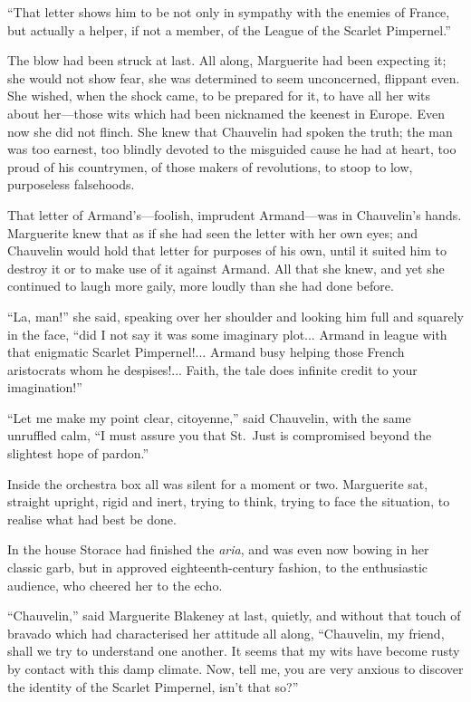 \documentclass[paper=5.5in:8.5in,BCOR=7mm,twoside,DIV=calc,12pt,usegeometry,chapterprefix,endperiod,headings=big]{scrbook}
\begin{document}
\enquote{That letter shows him to be not only in sympathy with the enemies of France, but actually a helper, if not a member, of the League of the Scarlet Pimpernel.}

The blow had been struck at last. All along, Marguerite had been expecting it; she would not show fear, she was determined to seem unconcerned, flippant even. She wished, when the shock came, to be prepared for it, to have all her wits about her---those wits which had been nicknamed the keenest in Europe. Even now she did not flinch. She knew that Chauvelin had spoken the truth; the man was too earnest, too blindly devoted to the misguided cause he had at heart, too proud of his countrymen, of those makers of revolutions, to stoop to low, purposeless falsehoods.

That letter of Armand's---foolish, imprudent Armand---was in Chauvelin's hands. Marguerite knew that as if she had seen the letter with her own eyes; and Chauvelin would hold that letter for purposes of his own, until it suited him to destroy it or to make use of it against Armand. All that she knew, and yet she continued to laugh more gaily, more loudly than she had done before.

\enquote{La, man!} she said, speaking over her shoulder and looking him full and squarely in the face, \enquote{did I not say it was some imaginary plot... Armand in league with that enigmatic Scarlet Pimpernel!... Armand busy helping those French aristocrats whom he despises!... Faith, the tale does infinite credit to your imagination!}

\enquote{Let me make my point clear, citoyenne,} said Chauvelin, with the same unruffled calm, \enquote{I must assure you that St.~Just is compromised beyond the slightest hope of pardon.}

Inside the orchestra box all was silent for a moment or two. Marguerite sat, straight upright, rigid and inert, trying to think, trying to face the situation, to realise what had best be done.

In the house Storace had finished the \textit{aria}, and was even now bowing in her classic garb, but in approved eighteenth-century fashion, to the enthusiastic audience, who cheered her to the echo.

\enquote{Chauvelin,} said Marguerite Blakeney at last, quietly, and without that touch of bravado which had characterised her attitude all along, \enquote{Chauvelin, my friend, shall we try to understand one another. It seems that my wits have become rusty by contact with this damp climate. Now, tell me, you are very anxious to discover the identity of the Scarlet Pimpernel, isn't that so?}
\end{document}
